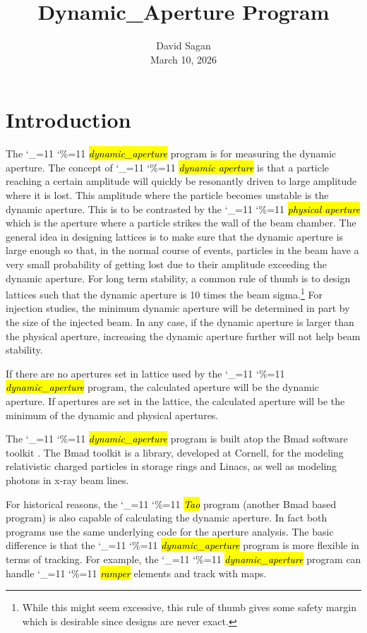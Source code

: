 \documentclass{hitec}
\title{Dynamic_Aperture Program}
\author{}
\date{David Sagan \\ March 10, 2026}
\newcommand\dottcmd[1]{\hl{\em#1}\endgroup}
\newcommand{\vn}{\begingroup\catcode`\_=11 \catcode`\%=11 \dottcmd}
\newcommand{\da}{\vn{dynamic_aperture}\xspace}
\newcommand{\Section}[1]{\section{#1}\vspace*{-1ex}}
\begin{document}

\maketitle

\tableofcontents

\Section{Introduction} 
\label{s:intro}

The \da program is for measuring the dynamic aperture. The concept of \vn{dynamic aperture} is that
a particle reaching a certain amplitude will quickly be resonantly driven to large amplitude where
it is lost. This amplitude where the particle becomes unstable is the dynamic aperture. This is to
be contrasted by the \vn{physical aperture} which is the aperture where a particle strikes the wall
of the beam chamber. The general idea in designing lattices is to make sure that the dynamic
aperture is large enough so that, in the normal course of events, particles in the beam have a very
small probability of getting lost due to their amplitude exceeding the dynamic aperture. For long
term stability, a common rule of thumb is to design lattices such that the dynamic aperture is 10 times
the beam sigma.\footnote
  {
While this might seem excessive, this rule of thumb gives some safety margin which is desirable
since designs are never exact.
  }
For injection studies, the minimum dynamic aperture will be determined in part by the size of the
injected beam. In any case, if the dynamic aperture is larger than the physical aperture, increasing
the dynamic aperture further will not help beam stability. 

If there are no apertures set in lattice used by the \da program, the calculated aperture will be the
dynamic aperture. If apertures are set in the lattice, the calculated aperture will be the minimum of
the dynamic and physical apertures.

The \da program is built atop the Bmad software toolkit \cite{b:bmad}. The Bmad toolkit is a
library, developed at Cornell, for the modeling relativistic charged particles in storage rings and
Linacs, as well as modeling photons in x-ray beam lines.

For historical reasons, the \vn{Tao} program (another Bmad based program) is also capable of
calculating the dynamic aperture.  In fact both programs use the same underlying code for the
aperture analysis. The basic difference is that the \da program is more flexible in terms of
tracking. For example, the \da program can handle \vn{ramper} elements and track with maps.
\end{document}
